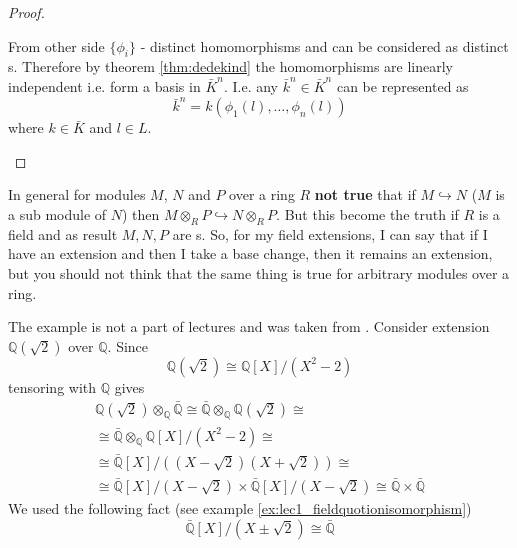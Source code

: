 \begin{theorem}
\begin{proof}
\begin{enumerate}
{        From other side $\{\phi_i\}$ - distinct homomorphisms and can
        be considered as distinct s. Therefore
        by theorem \ref{thm:dedekind} the homomorphisms are linearly
        independent i.e. form a basis in $\bar{K}^n$. I.e.
        any $\bar{k}^n \in \bar{K}^n$ can be represented as
        \[
        \bar{k}^n = k
        \left(
        \phi_1\left(l\right),
        \dots,
        \phi_n\left(l\right)
        \right)
        \]
        where $k \in \bar{K}$ and $l \in L$.
      }
    \end{enumerate}
  \end{proof}
  \label{thm:lec5_1}
\end{theorem}
\begin{remark}
In general for modules $M$, $N$ and $P$ over a ring $R$ \textbf{not true} that
if $M \hookrightarrow N$ ($M$ is a sub module of $N$) then
$M \otimes_R P \hookrightarrow N \otimes_R P$. But this become the
truth if $R$ is a field and as result $M,N,P$ are
s. So, for my field extensions, I can say
that if I have an extension and then I take a base change, then it
remains an extension, but  you should not think that the same thing is
true for arbitrary modules over a ring.  
\end{remark}

\begin{example}
  The example is not a part of lectures and was taken from
  \cite{bib:KeithConradSeparability2}.
  Consider extension $\mathbb{Q}\left(\sqrt{2}\right)$ over
  $\mathbb{Q}$. Since
  \[
  \mathbb{Q}\left(\sqrt{2}\right) \cong
  \mathbb{Q}\left[X\right]/\left(X^2 - 2\right)
  \]
  tensoring with $\mathbb{Q}$ gives
  \begin{eqnarray}
    \mathbb{Q}\left(\sqrt{2}\right) \otimes_{\mathbb{Q}}
    \bar{\mathbb{Q}} \cong
    \bar{\mathbb{Q}} \otimes_{\mathbb{Q}}
    \mathbb{Q}\left(\sqrt{2}\right)
    \cong
    \nonumber \\
    \cong
    \bar{\mathbb{Q}} \otimes_{\mathbb{Q}}
    \mathbb{Q}\left[X\right]/\left(X^2 - 2\right)
    \cong
    \nonumber \\
    \cong
    \bar{\mathbb{Q}}\left[X\right]/
    \left(
    \left(X - \sqrt{2}\right)
    \left(X + \sqrt{2}\right)
    \right)
    \cong
    \nonumber \\
    \cong
    \bar{\mathbb{Q}}\left[X\right]/\left(X - \sqrt{2}\right)
    \times
    \bar{\mathbb{Q}}\left[X\right]/\left(X - \sqrt{2}\right)
    \cong
    \bar{\mathbb{Q}} \times \bar{\mathbb{Q}}
    \nonumber
  \end{eqnarray}
  We used the following fact (see example
  \ref{ex:lec1_fieldquotionisomorphism}) 
  \[
  \bar{\mathbb{Q}}\left[X\right]/\left(X \pm \sqrt{2}\right)
  \cong
  \bar{\mathbb{Q}}
  \]  
  \label{ex:lec5_conrad}
\end{example}

